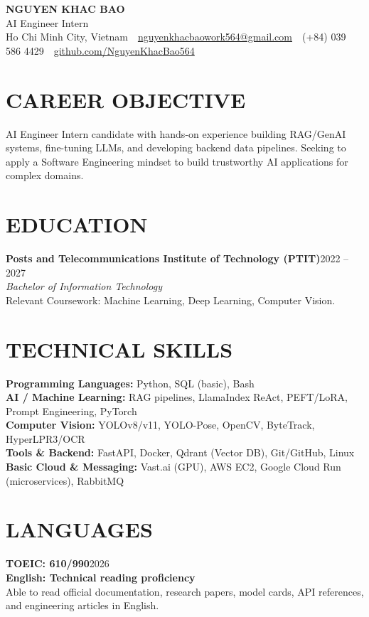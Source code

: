 \documentclass[10pt,a4paper]{article}
\newcommand{\entryhead}[2]{%
    \noindent\textbf{#1}\hfill #2\\[-2pt]
}
\newcommand{\entrysub}[1]{%
    \noindent\textit{#1}\\[-1pt]
}
\begin{document}
\fontsize{9.35}{10.35}\selectfont

\begin{center}
    {\Large\textbf{NGUYEN KHAC BAO}}\\[-1pt]
    AI Engineer Intern\\[2pt]
    Ho Chi Minh City, Vietnam
    \,\textbar\,
    \href{mailto:nguyenkhacbaowork564@gmail.com}{nguyenkhacbaowork564@gmail.com}
    \,\textbar\,
    (+84) 039 586 4429
    \,\textbar\,
    \href{https://github.com/NguyenKhacBao564}{github.com/NguyenKhacBao564}
\end{center}

\section{CAREER OBJECTIVE}
AI Engineer Intern candidate with hands-on experience building RAG/GenAI systems, fine-tuning LLMs, and developing backend data pipelines. Seeking to apply a Software Engineering mindset to build trustworthy AI applications for complex domains.

\section{EDUCATION}
\entryhead{Posts and Telecommunications Institute of Technology (PTIT)}{2022 -- 2027}
\entrysub{Bachelor of Information Technology}
Relevant Coursework: Machine Learning, Deep Learning, Computer Vision.

\section{TECHNICAL SKILLS}
\textbf{Programming Languages:} Python, SQL (basic), Bash\\
\textbf{AI / Machine Learning:} RAG pipelines, LlamaIndex ReAct, PEFT/LoRA, Prompt Engineering, PyTorch\\
\textbf{Computer Vision:} YOLOv8/v11, YOLO-Pose, OpenCV, ByteTrack, HyperLPR3/OCR\\
\textbf{Tools \& Backend:} FastAPI, Docker, Qdrant (Vector DB), Git/GitHub, Linux\\
\textbf{Basic Cloud \& Messaging:} Vast.ai (GPU), AWS EC2, Google Cloud Run (microservices), RabbitMQ

\section{LANGUAGES}
\entryhead{TOEIC: 610/990}{2026}
\entryhead{English: Technical reading proficiency}{}
Able to read official documentation, research papers, model cards, API references, and engineering articles in English.
\end{document}
